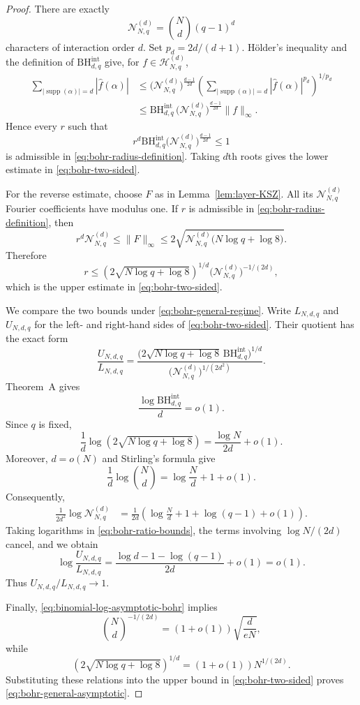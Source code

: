 \documentclass[11pt,a4paper]{article}
\numberwithin{equation}{section}
\theoremstyle{cleanplain}
\theoremstyle{cleandefinition}
\theoremstyle{cleanremark}
\newcommand{\supp}{\operatorname{supp}}
\newcommand{\BHint}[2]{\mathrm{BH}^{\mathrm{int}}_{#1,#2}}
\begin{document}
\begin{proof}
There are exactly
\[
 \mathcal N_{N,q}^{(d)}=\binom Nd(q-1)^d
\]
characters of interaction order $d$.  Set $p_d=2d/(d+1)$.  H\"older's
inequality and the definition of $\BHint{d}{q}$ give, for
$f\in\mathcal H_{N,q}^{(d)}$,
\begin{align*}
 \sum_{|\supp(\alpha)|=d}|\widehat f(\alpha)|
 &\leq \bigl(\mathcal N_{N,q}^{(d)}\bigr)^{\frac{d-1}{2d}}
 \left(\sum_{|\supp(\alpha)|=d}
 |\widehat f(\alpha)|^{p_d}\right)^{1/p_d}\\
 &\leq
 \BHint{d}{q}\,
 \bigl(\mathcal N_{N,q}^{(d)}\bigr)^{\frac{d-1}{2d}}\|f\|_\infty.
\end{align*}
Hence every $r$ such that
\[
 r^d\BHint{d}{q}\bigl(\mathcal N_{N,q}^{(d)}\bigr)^{\frac{d-1}{2d}}\leq1
\]
is admissible in \eqref{eq:bohr-radius-definition}.  Taking $d$th roots
gives the lower estimate in \eqref{eq:bohr-two-sided}.

For the reverse estimate, choose $F$ as in Lemma~\ref{lem:layer-KSZ}.  All its
$\mathcal N_{N,q}^{(d)}$ Fourier coefficients have modulus one.  If $r$ is admissible
in \eqref{eq:bohr-radius-definition}, then
\[
 r^d\mathcal N_{N,q}^{(d)}
 \leq\|F\|_\infty
 \leq2\sqrt{\mathcal N_{N,q}^{(d)}\bigl(N\log q+\log8\bigr)}.
\]
Therefore
\[
 r\leq
 \left(2\sqrt{N\log q+\log8}\right)^{1/d}
 \bigl(\mathcal N_{N,q}^{(d)}\bigr)^{-1/(2d)},
\]
which is the upper estimate in \eqref{eq:bohr-two-sided}.

We compare the two bounds under \eqref{eq:bohr-general-regime}.  Write
$L_{N,d,q}$ and $U_{N,d,q}$ for the left- and right-hand sides of
\eqref{eq:bohr-two-sided}.  Their quotient has the exact form
\begin{equation}\label{eq:bohr-ratio-bounds}
 \frac{U_{N,d,q}}{L_{N,d,q}}
 =
 \frac{\bigl(2\sqrt{N\log q+\log8}\,\BHint{d}{q}\bigr)^{1/d}}
 {\bigl(\mathcal N_{N,q}^{(d)}\bigr)^{1/(2d^2)}}.
\end{equation}
Theorem~A gives
\[
 \frac{\log\BHint{d}{q}}{d}=o(1).
\]
Since $q$ is fixed,
\[
 \frac1d\log\left(2\sqrt{N\log q+\log8}\right)
 =\frac{\log N}{2d}+o(1).
\]
Moreover, $d=o(N)$ and Stirling's formula give
\begin{equation}\label{eq:binomial-log-asymptotic-bohr}
 \frac1d\log\binom Nd
 =\log\frac Nd+1+o(1).
\end{equation}
Consequently,
\begin{align*}
 \frac1{2d^2}\log \mathcal N_{N,q}^{(d)}
 &=\frac1{2d}\left(
   \log\frac Nd+1+\log(q-1)+o(1)\right).
\end{align*}
Taking logarithms in \eqref{eq:bohr-ratio-bounds}, the terms involving
$\log N/(2d)$ cancel, and we obtain
\[
 \log\frac{U_{N,d,q}}{L_{N,d,q}}
 =\frac{\log d-1-\log(q-1)}{2d}+o(1)=o(1).
\]
Thus $U_{N,d,q}/L_{N,d,q}\to1$.

Finally, \eqref{eq:binomial-log-asymptotic-bohr} implies
\[
 \binom Nd^{-1/(2d)}
 =(1+o(1))\sqrt{\frac{d}{eN}},
\]
while
\[
 \left(2\sqrt{N\log q+\log8}\right)^{1/d}
 =(1+o(1))N^{1/(2d)}.
\]
Substituting these relations into the upper bound in
\eqref{eq:bohr-two-sided} proves \eqref{eq:bohr-general-asymptotic}.
\end{proof}
\end{document}
